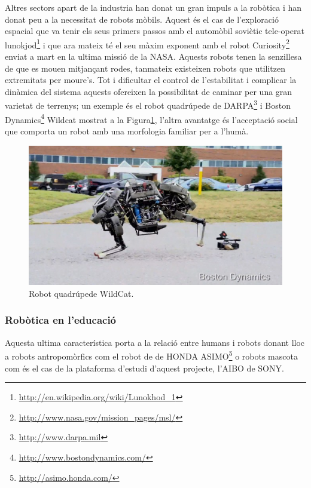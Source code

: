 \documentclass[12pt,a4paper,final,twoside]{article}
\begin{document}
Altres sectors apart de la industria han donat un gran impuls a la robòtica i han donat peu a la necessitat de robots mòbils. Aquest és el cas de l'exploració espacial que va tenir els seus primers passos amb el automòbil soviètic tele-operat lunokjod\footnote{\url{http://en.wikipedia.org/wiki/Lunokhod_1}} i que ara mateix té el seu màxim exponent amb el robot Curiosity\footnote{\url{http://www.nasa.gov/mission_pages/msl/}} enviat a mart en la ultima missió de la NASA. Aquests robots tenen la senzillesa de que es mouen mitjançant rodes, tanmateix existeixen robots que utilitzen extremitats per moure's. Tot i dificultar el control de l'estabilitat i complicar la dinàmica del sistema aquests ofereixen la possibilitat de caminar per una gran varietat de terrenys; un exemple és el robot quadrúpede de DARPA\footnote{\url{http://www.darpa.mil}} i Boston Dynamics\footnote{\url{http://www.bostondynamics.com/}} Wildcat mostrat a la Figura\ref{fig:wildcat}, l'altra avantatge és l'acceptació social que comporta un robot amb una morfologia familiar per a l'humà. 

\begin{figure}[h!]
	\centering
    \includegraphics[scale=0.6]	{images/Wildcat.jpg}
	 \caption{Robot quadrúpede WildCat.}
  \label{fig:wildcat}
\end{figure}

\subsubsection{Robòtica en l'educació}
Aquesta ultima característica porta a la relació entre humans i robots donant lloc a robots antropomòrfics com el robot de de HONDA ASIMO\footnote{\url{http://asimo.honda.com/}} o robots mascota com és el cas de la plataforma d'estudi d'aquest projecte, l'AIBO de SONY.
\end{document}
